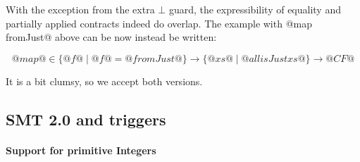 With the exception from the extra $\bot$ guard, the expressibility of
equality and partially applied contracts indeed do overlap. The example
with @map fromJust@ above can be now instead be written:

$$@map@ \in \{ @f@ \mid @f@ = @fromJust@ \} \to \{ @xs@ \mid @all isJust xs@ \} \to @CF@$$

It is a bit clumsy, so we accept both versions.

\subsection{SMT 2.0 and triggers}
\paragraph{Support for primitive Integers}
